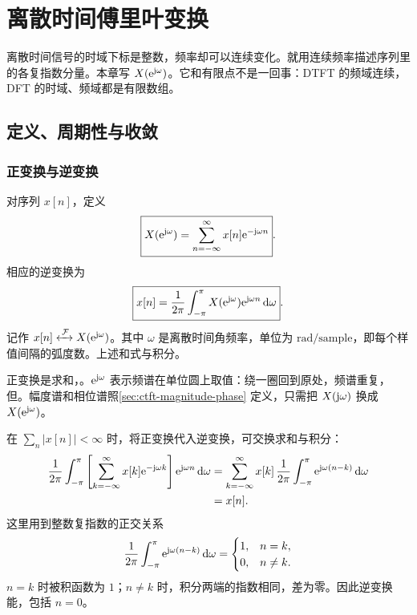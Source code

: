 \begingroup
\raggedbottom
\chapter{离散时间傅里叶变换}
\label{chap:dtft}

离散时间信号的时域下标是整数，频率却可以连续变化。就用连续频率描述序列里的各复指数分量。本章写 $X(\mathrm{e}^{\mathrm{j}\omega})$。它和有限点不是一回事：DTFT 的频域连续，DFT 的时域、频域都是有限数组。

\section{定义、周期性与收敛}
\label{sec:dtft-definition}

\subsection{正变换与逆变换}

\begin{definition}[离散时间傅里叶变换]
  对序列 $x[n]$，定义
  \begin{equation}
    \boxed{X(\mathrm{e}^{\mathrm{j}\omega})=\sum_{n=-\infty}^{\infty}x[n]\mathrm{e}^{-\mathrm{j}\omega n}}.
    \label{eq:dtft-definition}
  \end{equation}
  相应的逆变换为
  \begin{equation}
    \boxed{x[n]=\frac{1}{2\pi}\int_{-\pi}^{\pi}
      X(\mathrm{e}^{\mathrm{j}\omega})\mathrm{e}^{\mathrm{j}\omega n}\mathop{}\!\mathrm{d}\omega}.
    \label{eq:dtft-inverse}
  \end{equation}
  记作 $x[n]\mathrel{\xleftrightarrow{\,\mathcal{F}\,}} X(\mathrm{e}^{\mathrm{j}\omega})$。其中 $\omega$ 是离散时间角频率，单位为 $\mathrm{rad/sample}$，即每个样值间隔的弧度数。上述和式与积分。
\end{definition}

正变换是求和，。$\mathrm{e}^{\mathrm{j}\omega}$ 表示频谱在单位圆上取值：绕一圈回到原处，频谱重复，但。幅度谱和相位谱照\cref{sec:ctft-magnitude-phase} 定义，只需把 $X(\mathrm{j}\omega)$ 换成 $X(\mathrm{e}^{\mathrm{j}\omega})$。

在 $\sum_n|x[n]|<\infty$ 时，将正变换代入逆变换，可交换求和与积分：
\begin{align*}
  \frac{1}{2\pi}\int_{-\pi}^{\pi}
    \left[\sum_{k=-\infty}^{\infty}x[k]\mathrm{e}^{-\mathrm{j}\omega k}\right]
    \mathrm{e}^{\mathrm{j}\omega n}\mathop{}\!\mathrm{d}\omega
  &=\sum_{k=-\infty}^{\infty}x[k]\,
    \frac{1}{2\pi}\int_{-\pi}^{\pi}\mathrm{e}^{\mathrm{j}\omega(n-k)}\mathop{}\!\mathrm{d}\omega\\
  &=x[n].
\end{align*}
这里用到整数复指数的正交关系
\begin{equation}
  \frac{1}{2\pi}\int_{-\pi}^{\pi}\mathrm{e}^{\mathrm{j}\omega(n-k)}\mathop{}\!\mathrm{d}\omega
  =\begin{cases}1,&n=k,\\0,&n\ne k.\end{cases}
  \label{eq:dtft-orthogonality}
\end{equation}
$n=k$ 时被积函数为 $1$；$n\ne k$ 时，积分两端的指数相同，差为零。因此逆变换能，包括 $n=0$。


